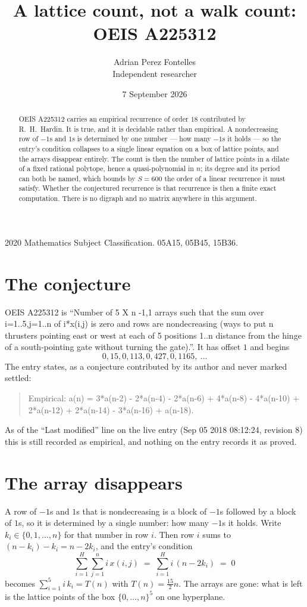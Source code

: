 \documentclass[11pt,a4paper]{article}
\title{A lattice count, not a walk count: OEIS A225312}
\author{Adrian Perez Fontelles\\ \small Independent researcher}
\date{7 September 2026}
\theoremstyle{plain}
\theoremstyle{definition}
\begin{document}
\maketitle

\begin{abstract}
OEIS A225312 carries an empirical recurrence of order $18$ contributed by R.~H.~Hardin. It is
true, and it is decidable rather than empirical. A nondecreasing row of $-1$s and $1$s is
determined by one number --- how many $-1$s it holds --- so the entry's condition collapses to
a single linear equation on a box of lattice points, and the arrays disappear entirely. The
count is then the number of lattice points in a dilate of a fixed rational polytope, hence a
quasi-polynomial in $n$; its degree and its period can both be named, which bounds by
$S=600$ the order of a linear recurrence it must satisfy. Whether the conjectured recurrence
is that recurrence is then a finite exact computation. There is no digraph and no matrix
anywhere in this argument.
\end{abstract}

\noindent\small 2020 Mathematics Subject Classification. 05A15, 05B45, 15B36.\normalsize

\section{The conjecture}

OEIS A225312 is ``Number of 5 X n -1,1 arrays such that the sum over i=1..5,j=1..n of i*x(i,j) is zero and rows are nondecreasing (ways to put n thrusters pointing east or west at each of 5 positions 1..n distance from the hinge of a south-pointing gate without turning the gate).''. It has offset $1$ and begins
\[
0, 15, 0, 113, 0, 427, 0, 1165,\ \dots
\]
The entry states, as a conjecture contributed by its author and never marked settled:
\begin{quote}
Empirical: a(n) = 3*a(n-2) - 2*a(n-4) - 2*a(n-6) + 4*a(n-8) - 4*a(n-10) + 2*a(n-12) + 2*a(n-14) - 3*a(n-16) + a(n-18).
\end{quote}
As of the ``Last modified'' line on the live entry (Sep 05 2018 08:12:24, revision 8) this is still
recorded as empirical, and nothing on the entry records it as proved.

\section{The array disappears}

A row of $-1$s and $1$s that is nondecreasing is a block of $-1$s followed by a block of $1$s, so it is determined by a single number: how many $-1$s it holds. Write $k_i\in\{0,1,\dots,n\}$ for that number in row $i$. Then row $i$ sums to $(n-k_i)-k_i = n-2k_i$, and the entry's condition
\[ \sum_{i=1}^{H}\sum_{j=1}^{n} i\,x(i,j) \;=\; \sum_{i=1}^{H} i\,(n-2k_i) \;=\; 0 \]
becomes $\sum_{i=1}^{5} i\,k_i = T(n)$ with $T(n)=\tfrac{15}{2}n$. The arrays are gone: what is left is the lattice points of the box $\{0,\dots,n\}^{5}$ on one hyperplane.
\end{document}
